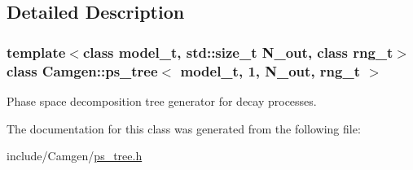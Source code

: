 \subsection{Detailed Description}
\subsubsection*{template$<$class model\+\_\+t, std\+::size\+\_\+t N\+\_\+out, class rng\+\_\+t$>$class Camgen\+::ps\+\_\+tree$<$ model\+\_\+t, 1, N\+\_\+out, rng\+\_\+t $>$}

Phase space decomposition tree generator for decay processes. 

The documentation for this class was generated from the following file\+:\begin{DoxyCompactItemize}
\item 
include/\+Camgen/\hyperlink{a00744}{ps\+\_\+tree.\+h}\end{DoxyCompactItemize}
